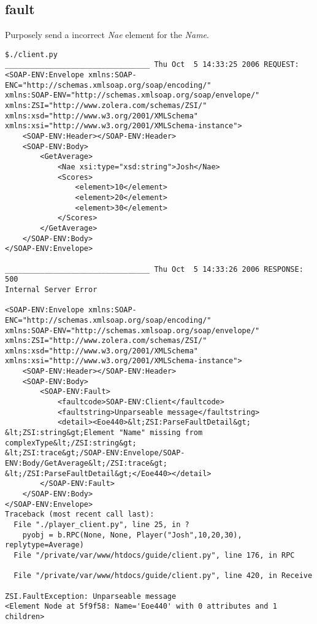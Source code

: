 \subsection{fault} Purposely send a incorrect \emph{Nae} element for the
\emph{Name}.
\begin{verbatim}
$./client.py
_________________________________ Thu Oct  5 14:33:25 2006 REQUEST:
<SOAP-ENV:Envelope xmlns:SOAP-ENC="http://schemas.xmlsoap.org/soap/encoding/"
xmlns:SOAP-ENV="http://schemas.xmlsoap.org/soap/envelope/"
xmlns:ZSI="http://www.zolera.com/schemas/ZSI/"
xmlns:xsd="http://www.w3.org/2001/XMLSchema"
xmlns:xsi="http://www.w3.org/2001/XMLSchema-instance">
	<SOAP-ENV:Header></SOAP-ENV:Header>
	<SOAP-ENV:Body>
		<GetAverage>
			<Nae xsi:type="xsd:string">Josh</Nae>
			<Scores>
				<element>10</element>
				<element>20</element>
				<element>30</element>
			</Scores>
		</GetAverage>
	</SOAP-ENV:Body>
</SOAP-ENV:Envelope>

_________________________________ Thu Oct  5 14:33:26 2006 RESPONSE:
500
Internal Server Error

<SOAP-ENV:Envelope xmlns:SOAP-ENC="http://schemas.xmlsoap.org/soap/encoding/"
xmlns:SOAP-ENV="http://schemas.xmlsoap.org/soap/envelope/"
xmlns:ZSI="http://www.zolera.com/schemas/ZSI/"
xmlns:xsd="http://www.w3.org/2001/XMLSchema"
xmlns:xsi="http://www.w3.org/2001/XMLSchema-instance">
	<SOAP-ENV:Header></SOAP-ENV:Header>
	<SOAP-ENV:Body>
		<SOAP-ENV:Fault>
			<faultcode>SOAP-ENV:Client</faultcode>
			<faultstring>Unparseable message</faultstring>
			<detail><Eoe440>&lt;ZSI:ParseFaultDetail&gt;
&lt;ZSI:string&gt;Element "Name" missing from complexType&lt;/ZSI:string&gt;
&lt;ZSI:trace&gt;/SOAP-ENV:Envelope/SOAP-ENV:Body/GetAverage&lt;/ZSI:trace&gt;
&lt;/ZSI:ParseFaultDetail&gt;</Eoe440></detail>
		</SOAP-ENV:Fault>
	</SOAP-ENV:Body>
</SOAP-ENV:Envelope>
Traceback (most recent call last):
  File "./player_client.py", line 25, in ?
    pyobj = b.RPC(None, None, Player("Josh",10,20,30), replytype=Average)
  File "/private/var/www/htdocs/guide/client.py", line 176, in RPC

  File "/private/var/www/htdocs/guide/client.py", line 420, in Receive

ZSI.FaultException: Unparseable message
<Element Node at 5f9f58: Name='Eoe440' with 0 attributes and 1 children>
\end{verbatim}

